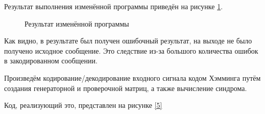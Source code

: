 \documentclass[a4paper,14pt]{extarticle}
\begin{document}
Результат выполнения изменённой программы приведён на рисунке \ref{4}.
\begin{figure}[H]
\caption{Результат изменённой программы}
\label{4}
\end{figure}

Как видно, в результате был получен ошибочный результат, на выходе не было получено исходное сообщение. Это следствие из-за большого количества ошибок в закодированном сообщении. 

Произведём кодирование/декодирование входного сигнала кодом Хэмминга путём создания генераторной и проверочной матриц, а также вычисление синдрома.

Код, реализующий это, представлен на рисунке \ref{5}
\end{document}
